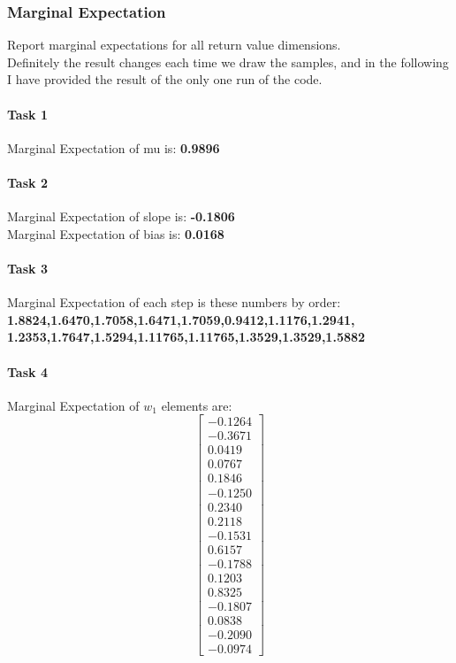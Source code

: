 \documentclass{article}
\def\blu#1{{\color{blu}#1}}
\begin{document}
\subsubsection{Marginal Expectation}
\blu{Report marginal expectations for all return value dimensions.}\\
Definitely  the result changes each time we draw the samples, and in the following I have provided the result of the only one run of the code.
\paragraph{Task 1}
Marginal Expectation of mu is: \textbf{0.9896}
\paragraph{Task 2}
Marginal Expectation of slope is: \textbf{-0.1806}\\
Marginal Expectation of bias is: \textbf{0.0168}
\paragraph{Task 3}
Marginal Expectation of each step is these numbers by order:\\ \textbf{1.8824,1.6470,1.7058,1.6471,1.7059,0.9412,1.1176,1.2941,\\1.2353,1.7647,1.5294,1.11765,1.11765,1.3529,1.3529,1.5882}
\paragraph{Task 4}
Marginal Expectation of $w_1$ elements are:
\[
\begin{bmatrix}
-0.1264 \\ -0.3671 \\ 0.0419 \\ 0.0767 \\ 0.1846 \\ -0.1250 \\ 0.2340 \\ 0.2118 \\ -0.1531 \\ 0.6157 \\ -0.1788 \\ 0.1203 \\ 0.8325 \\ -0.1807 \\ 0.0838 \\ -0.2090 \\ -0.0974
\end{bmatrix}
\]
\end{document}
